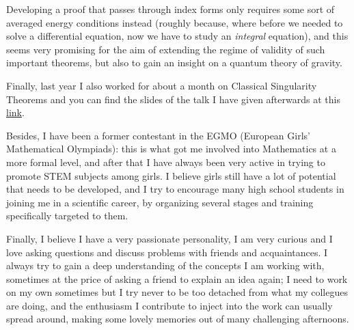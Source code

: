 \documentclass[12pt, a4paper]{article}
\begin{document}
Developing a proof that passes through index forms only requires some sort of averaged energy conditions instead (roughly because, where before we needed to solve a differential equation, now we have to study an \emph{integral} equation), and this seems very promising for the aim of extending the regime of validity of such important theorems, but also to gain an insight on a quantum theory of gravity.

Finally, last year I also worked for about a month on Classical Singularity Theorems and you can find the slides of the talk I have given afterwards at this \href{https://uz.sns.it/~ver22albireo/ext-file/colloquio/slides.pdf}{link}.

Besides, I have been a former contestant in the EGMO (European Girls' Mathematical Olympiads): this is what got me involved into Mathematics at a more formal level, and after that I have always been very active in trying to promote STEM subjects among girls. I believe girls still have a lot of potential that needs to be developed, and I try to encourage many high school students in joining me in a scientific career, by organizing several stages and training specifically targeted to them.

Finally, I believe I have a very passionate personality, I am very curious and I love asking questions and discuss problems with friends and acquaintances. I always try to gain a deep understanding of the concepts I am working with, sometimes at the price of asking a friend to explain an idea again; I need to work on my own sometimes but I try never to be too detached from what my collegues are doing, and the enthusiasm I contribute to inject into the work can usually spread around, making some lovely memories out of many challenging afternoons.
\end{document}
